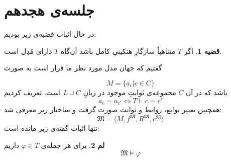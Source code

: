 \documentclass[12pt,a4paper]{article}
\theoremstyle{definition}
\newtheorem{thm}{قضیه}
\newtheorem{lem}[thm]{لم}
\begin{document}
	\section{جلسه‌ی هجدهم}
	در حال اثبات قضیه‌ی زیر بودیم:
	\begin{thm}
		اگر 
		$ T $
		متناهیاً سازگارِ هنکینیِ کامل باشد آن‌گاه 
		$ T $
		دارای مُدِل است.
	\end{thm}
گفتیم که جهان  مدل مورد نظر ما قرار است به صورت

		\[ M=\{ a_c | c\in C \} \]
		باشد که در آن
		$C$
		مجموعه‌ی ثوابتِ موجود در زبانِ
		$L\cup C$ 
		است. تعریف کردیم
		\[ a_c = a_{c'} \iff T\vdash c=c' \]
همچنین	تعبیر توابع، روابط و ثوابت صورت گرفت و ساختار زیر معرفی شد:
	\[ \mathfrak{M}=\langle M,f^\mathfrak{M},R^\mathfrak{M},c^\mathfrak{M}\rangle \]
تنها اثبات گفته‌ی زیر مانده است:
	\begin{lem}
		برای هر جمله‌ی 
		$ \varphi\in T $
		داریم
		\[ \mathfrak{M}\models\varphi \]
	\end{lem}
\end{document}
